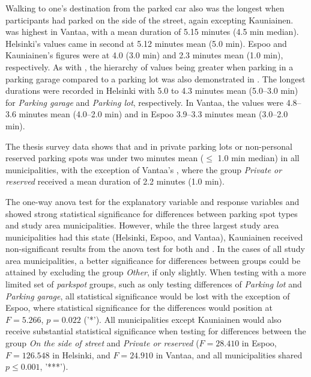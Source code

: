 Walking to one's destination from the parked car also was the longest when participants had parked on the side of the street, again excepting Kauniainen.  was highest in Vantaa, with a mean duration of 5.15 minutes (4.5 min median). Helsinki's values came in second at 5.12 minutes mean (5.0 min). Espoo and Kauniainen's figures were at 4.0 (3.0 min) and 2.3 minutes mean (1.0 min), respectively. As with , the hierarchy of values being greater when parking in a parking garage compared to a parking lot was also demonstrated in . The longest durations were recorded in Helsinki with 5.0 to 4.3 minutes mean (5.0--3.0 min) for \textit{Parking garage} and \textit{Parking lot}, respectively. In Vantaa, the values were 4.8--3.6 minutes mean (4.0--2.0 min) and in Espoo 3.9--3.3 minutes mean (3.0--2.0 min). 

The thesis survey data shows that  and  in private parking lots or non-personal reserved parking spots was under two minutes mean ($\leq$ 1.0 min median) in all municipalities, with the exception of Vantaa's , where the group \textit{Private or reserved} received a mean duration of 2.2 minutes (1.0 min).

The one-way \acrshort{anova} test for the explanatory variable  and response variables  and  showed strong statistical significance for differences between parking spot types and study area municipalities. However, while the three largest study area municipalities had this state (Helsinki, Espoo, and Vantaa), Kauniainen received non-significant results from the \acrshort{anova} test for both  and . In the cases of all study area municipalities, a better significance for differences between  groups could be attained by excluding the group \textit{Other}, if only slightly. When testing with a more limited set of \textit{parkspot} groups, such as only testing differences of \textit{Parking lot} and \textit{Parking garage}, all statistical significance would be lost with the exception of Espoo, where statistical significance for the differences would position at $F = 5.266$, $p = 0.022$ ('*'). All municipalities except Kauniainen would also receive substantial statistical significance when testing for differences between the group \textit{On the side of street} and \textit{Private or reserved} ($F = 28.410$ in Espoo, $F = 126.548$ in Helsinki, and $F = 24.910$ in Vantaa, and all municipalities shared $p \leq 0.001$, '***').

